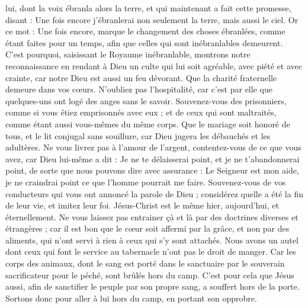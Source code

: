\begin{multicols}{2}
lui, dont la voix ébranla alors la terre, et qui maintenant a fait cette promesse, disant : Une fois encore j'ébranlerai non seulement la terre, mais aussi le ciel.
Or ce mot : Une fois encore, marque le changement des choses ébranlées, comme étant faites pour un temps, afin que celles qui sont inébranlables demeurent.
C'est pourquoi, saisissant le Royaume inébranlable, montrons notre reconnaissance en rendant à Dieu un culte qui lui soit agréable, avec piété et avec crainte,
car notre Dieu est aussi un feu dévorant.
\VerseOne{}Que la charité fraternelle demeure dans vos cœurs.
N'oubliez pas l'hospitalité, car c’est par elle que quelques-uns ont logé des anges sans le savoir.
Souvenez-vous des prisonniers, comme si vous étiez emprisonnés avec eux ; et de ceux qui sont maltraités, comme étant aussi vous-mêmes du même corps.
Que le mariage soit honoré de tous, et le lit conjugal sans souillure, car Dieu jugera les débauchés et les adultères.
Ne vous livrez pas à l’amour de l’argent, contentez-vous de ce que vous avez, car Dieu lui-même a dit : Je ne te délaisserai point, et je ne t'abandonnerai point,
de sorte que nous pouvons dire avec assurance : Le Seigneur est mon aide, je ne craindrai point ce que l'homme pourrait me faire.
Souvenez-vous de vos conducteurs qui vous ont annoncé la parole de Dieu ; considérez quelle a été la fin de leur vie, et imitez leur foi.
Jésus-Christ est le même hier, aujourd'hui, et éternellement.
Ne vous laissez pas entrainer çà et là par des doctrines diverses et étrangères ; car il est bon que le cœur soit affermi par la grâce, et non par des aliments, qui n'ont servi à rien à ceux qui s'y sont attachés.
Nous avons un autel dont ceux qui font le service au tabernacle n'ont pas le droit de manger.
Car les corps des animaux, dont le sang est porté dans le sanctuaire par le souverain sacrificateur pour le péché, sont brûlés hors du camp.
C'est pour cela que Jésus aussi, afin de sanctifier le peuple par son propre sang, a souffert hors de la porte.
Sortons donc pour aller à lui hors du camp, en portant son opprobre.

\end{multicols}
